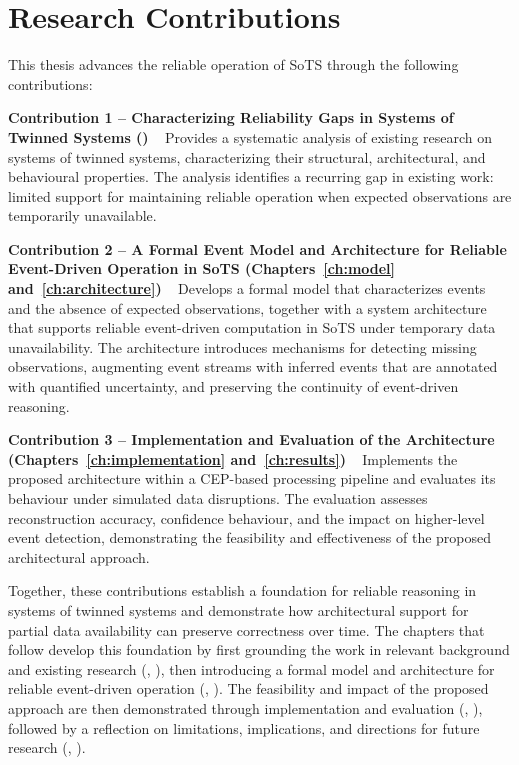 \section*{Research Contributions}

This thesis advances the reliable operation of SoTS through the following contributions:

\textbf{Contribution 1 – Characterizing Reliability Gaps in Systems of Twinned Systems ()}  
Provides a systematic analysis of existing research on systems of twinned systems, characterizing their structural, architectural, and behavioural properties. The analysis identifies a recurring gap in existing work: limited support for maintaining reliable operation when expected observations are temporarily unavailable.

\textbf{Contribution 2 – A Formal Event Model and Architecture for Reliable Event-Driven Operation in SoTS (Chapters~\ref{ch:model} and~\ref{ch:architecture})}  
Develops a formal model that characterizes events and the absence of expected observations, together with a system architecture that supports reliable event-driven computation in SoTS under temporary data unavailability. The architecture introduces mechanisms for detecting missing observations, augmenting event streams with inferred events that are annotated with quantified uncertainty, and preserving the continuity of event-driven reasoning.

\textbf{Contribution 3 – Implementation and Evaluation of the Architecture (Chapters~\ref{ch:implementation} and~\ref{ch:results})}  
Implements the proposed architecture within a CEP-based processing pipeline and evaluates its behaviour under simulated data disruptions. The evaluation assesses reconstruction accuracy, confidence behaviour, and the impact on higher-level event detection, demonstrating the feasibility and effectiveness of the proposed architectural approach.

\vspace{1em}
Together, these contributions establish a foundation for reliable reasoning in systems of twinned systems and demonstrate how architectural support for partial data availability can preserve correctness over time. The chapters that follow develop this foundation by first grounding the work in relevant background and existing research (, ), then introducing a formal model and architecture for reliable event-driven operation (, ). The feasibility and impact of the proposed approach are then demonstrated through implementation and evaluation (, ), followed by a reflection on limitations, implications, and directions for future research (, ).

